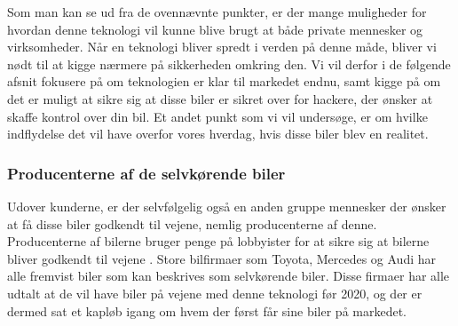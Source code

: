 Som man kan se ud fra de ovennævnte punkter, er der mange muligheder for hvordan denne teknologi vil kunne blive brugt at både private mennesker og virksomheder. Når en teknologi bliver spredt i verden på denne måde, bliver vi nødt til at kigge nærmere på sikkerheden omkring den. Vi vil derfor i de følgende afsnit fokusere på om teknologien er klar til markedet endnu, samt kigge på om det er muligt at sikre sig at disse biler er sikret over for hackere, der ønsker at skaffe kontrol over din bil. Et andet punkt som vi vil undersøge, er om hvilke indflydelse det vil have overfor vores hverdag, hvis disse biler blev en realitet.

\subsubsection{Producenterne af de selvkørende biler}
Udover kunderne, er der selvfølgelig også en anden gruppe mennesker der ønsker at få disse biler godkendt til vejene, nemlig producenterne af denne. Producenterne af bilerne bruger penge på lobbyister for at sikre sig at bilerne bliver godkendt til vejene \cite{soprweb}. Store bilfirmaer som Toyota, Mercedes og Audi har alle fremvist biler \cite{PopularMechanics} som kan beskrives som selvkørende biler. Disse firmaer har alle udtalt at de vil have biler på vejene med denne teknologi før 2020, og der er dermed sat et kapløb igang om hvem der først får sine biler på markedet. 